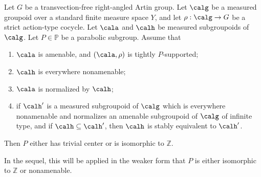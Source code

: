 \begin{lemma}\label{lemma:amenable-normal-maximal}
Let $G$ be a transvection-free right-angled Artin group. Let $\calg$ be a measured groupoid over a standard finite measure space $Y$, and let $\rho:\calg\to G$ be a strict action-type cocycle. Let $\cala$ and $\calh$ be measured subgroupoids of $\calg$. Let $P\in\mathbb{P}$ be a parabolic subgroup. Assume that
\begin{enumerate}
\item $\cala$ is amenable, and $(\cala,\rho)$ is tightly $P$-supported;
\item $\calh$ is everywhere nonamenable;
\item $\cala$ is normalized by $\calh$;
\item if $\calh'$ is a measured subgroupoid of $\calg$ which is everywhere nonamenable and normalizes an amenable subgroupoid of $\calg$ of infinite type, and if $\calh\subseteq\calh'$, then $\calh$ is stably equivalent to $\calh'$.
\end{enumerate}
Then $P$ either has trivial center or is isomorphic to $\mathbb{Z}$.
\end{lemma}

\begin{rk}
In the sequel, this will be applied in the weaker form that $P$ is either isomorphic to $\mathbb{Z}$ or nonamenable.
\end{rk}

